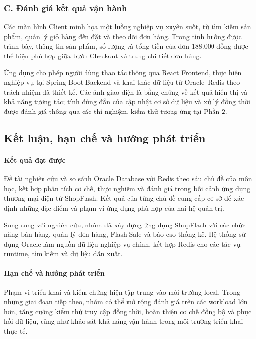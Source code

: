 \subsubsection*{C. Đánh giá kết quả vận hành}

Các màn hình Client minh họa một luồng nghiệp vụ xuyên suốt, từ tìm kiếm sản phẩm, quản lý giỏ hàng đến đặt và theo dõi đơn hàng. Trong tình huống được trình bày, thông tin sản phẩm, số lượng và tổng tiền của đơn 188.000 đồng được thể hiện phù hợp giữa bước Checkout và trang chi tiết đơn hàng.

Ứng dụng cho phép người dùng thao tác thông qua React Frontend, thực hiện nghiệp vụ tại Spring Boot Backend và khai thác dữ liệu từ Oracle–Redis theo trách nhiệm đã thiết kế. Các ảnh giao diện là bằng chứng về kết quả hiển thị và khả năng tương tác; tính đúng đắn của cập nhật cơ sở dữ liệu và xử lý đồng thời được đánh giá thông qua các thí nghiệm, kiểm thử tương ứng tại Phần 2.

\clearpage
\subsection{Kết luận, hạn chế và hướng phát triển}\label{sec:conclusion}

\paragraph*{Kết quả đạt được}

Đề tài nghiên cứu và so sánh Oracle Database với Redis theo sáu chủ đề của môn học, kết hợp phân tích cơ chế, thực nghiệm và đánh giá trong bối cảnh ứng dụng thương mại điện tử ShopFlash. Kết quả của từng chủ đề cung cấp cơ sở để xác định những đặc điểm và phạm vi ứng dụng phù hợp của hai hệ quản trị.

Song song với nghiên cứu, nhóm đã xây dựng ứng dụng ShopFlash với các chức năng bán hàng, quản lý đơn hàng, Flash Sale và báo cáo thống kê. Hệ thống sử dụng Oracle làm nguồn dữ liệu nghiệp vụ chính, kết hợp Redis cho các tác vụ runtime, tìm kiếm và dữ liệu dẫn xuất.

\paragraph*{Hạn chế và hướng phát triển}

Phạm vi triển khai và kiểm chứng hiện tập trung vào môi trường local. Trong những giai đoạn tiếp theo, nhóm có thể mở rộng đánh giá trên các workload lớn hơn, tăng cường kiểm thử truy cập đồng thời, hoàn thiện cơ chế đồng bộ và phục hồi dữ liệu, cũng như khảo sát khả năng vận hành trong môi trường triển khai thực tế.

